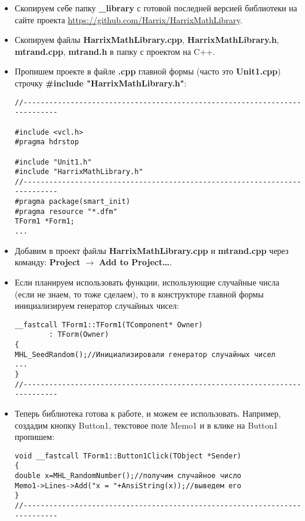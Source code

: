 \begin{itemize}
\item Скопируем себе папку \textbf{\_library} с готовой последней версией библиотеки на сайте проекта \href{https://github.com/Harrix/HarrixMathLibrary}{https://github.com/Harrix/HarrixMathLibrary}.

\item Скопируем файлы \textbf{HarrixMathLibrary.cpp}, \textbf{HarrixMathLibrary.h}, \textbf{mtrand.cpp}, \textbf{mtrand.h} в папку с проектом на C++.

\item Пропишем проекте в файле \textbf{.cpp} главной формы (часто это \textbf{Unit1.cpp}) строчку \textbf{\#include "HarrixMathLibrary.h"}:
\begin{lstlisting}[label=install_code_01,caption=Подключение библиотеки]
//---------------------------------------------------------------------------

#include <vcl.h>
#pragma hdrstop

#include "Unit1.h"
#include "HarrixMathLibrary.h"
//---------------------------------------------------------------------------
#pragma package(smart_init)
#pragma resource "*.dfm"
TForm1 *Form1;
...
\end{lstlisting}

\item Добавим в проект файлы \textbf{HarrixMathLibrary.cpp} и \textbf{mtrand.cpp} через команду: \textbf{Project} $\rightarrow$ \textbf{Add to Project\dots}.

\item Если планируем использовать функции, использующие случайные числа (если не знаем, то тоже сделаем), то в конструкторе главной формы инициализируем генератор случайных чисел:
\begin{lstlisting}[label=install_code_02,caption=Инициализация генератора случайных чисел]
__fastcall TForm1::TForm1(TComponent* Owner)
        : TForm(Owner)
{
MHL_SeedRandom();//Инициализировали генератор случайных чисел
...
}
//---------------------------------------------------------------------------
\end{lstlisting}

\item Теперь библиотека готова к работе, и можем ее использовать. Например, создадим кнопку Button1, текстовое поле Memo1 и в клике на Button1 пропишем:
\begin{lstlisting}[label=install_code_03,caption=Пример использования]
void __fastcall TForm1::Button1Click(TObject *Sender)
{
double x=MHL_RandomNumber();//получим случайное число
Memo1->Lines->Add("x = "+AnsiString(x));//выведем его
}
//---------------------------------------------------------------------------
\end{lstlisting}
\end{itemize}


